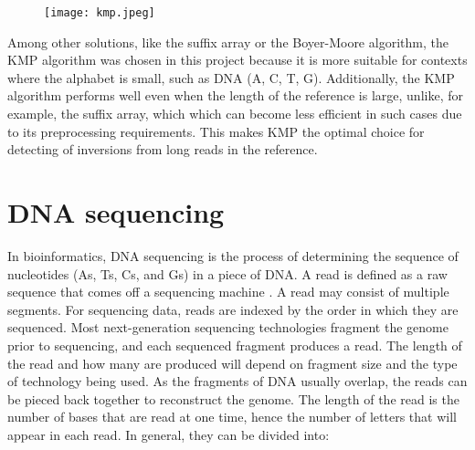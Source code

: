 \begin{figure}[h]

  \centering
    \texttt{[image: kmp.jpeg]}
  \label{fig:kmp}
\end{figure}

Among other solutions, like the suffix array or the Boyer-Moore algorithm, the KMP algorithm was chosen in this project because it is more suitable for contexts where the alphabet is small, such as DNA ({A, C, T, G}). Additionally, the KMP algorithm performs well even when the length of the reference is large, unlike, for example, the suffix array, which which can become less efficient in such cases due to its preprocessing requirements. This makes KMP the optimal choice for detecting of inversions from long reads in the reference. 

\section{DNA sequencing}

In bioinformatics, DNA sequencing is the process of determining the sequence of nucleotides (As, Ts, Cs, and Gs) in a piece of DNA. A read is defined as a raw sequence that comes off a sequencing machine \cite{noauthor_hts_nodate}. A read may consist of multiple segments. For sequencing data, reads are indexed by the order in which they are sequenced. Most next-generation sequencing technologies fragment the genome prior to sequencing, and each sequenced fragment produces a read. The length of the read and how many are produced will depend on fragment size and the type of technology being used. As the fragments of DNA usually overlap, the reads can be pieced back together to reconstruct the genome. The length of the read is the number of bases that are read at one time, hence the number of letters that will appear in each read. In general, they can be divided into:

